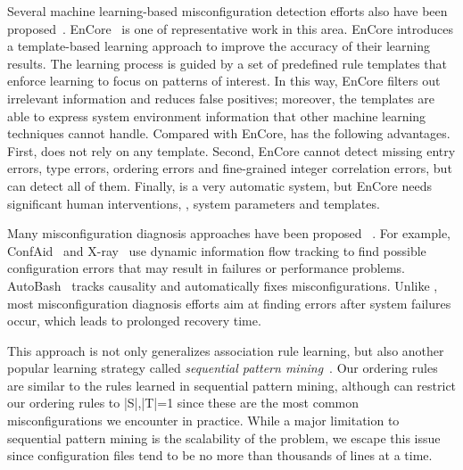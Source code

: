 Several machine learning-based misconfiguration detection efforts 
also have been proposed~\cite{yuan11context, zhang14encore}.
EnCore~\cite{zhang14encore} is one of representative work in this area.
EnCore introduces a template-based
learning approach to improve the accuracy of their learning results.
The learning process is guided by a set of predefined rule templates
that enforce learning to focus on patterns of interest.
In this way, EnCore filters out irrelevant information and reduces
false positives; moreover, the templates are able to express
system environment information that other machine learning
techniques cannot handle.
Compared with EnCore, \app has the following advantages.
First, \app does not rely on any template. 
Second, EnCore cannot detect missing entry errors, type errors,
ordering errors and fine-grained integer correlation errors,
but \app can detect all of them.
Finally, \app is a very automatic system, but
EnCore needs significant human interventions, \eg, system parameters
and templates.

Many misconfiguration diagnosis approaches have been proposed%
~\cite{attariyan10automating, attariyan12x-ray}.
For example, ConfAid~\cite{attariyan10automating} 
and X-ray~\cite{attariyan12x-ray} use dynamic information
flow tracking to find possible configuration errors that may result in
failures or performance problems. AutoBash~\cite{su07autobash} 
tracks causality and automatically fixes 
misconfigurations. Unlike \app, most misconfiguration
diagnosis efforts aim at finding errors after system
failures occur, which leads to prolonged recovery time.


This approach is not only generalizes association rule learning, but also another popular learning strategy called \textit{sequential pattern mining}~\cite{seqMine}.
Our ordering rules are similar to the rules learned in sequential pattern mining, although can restrict our ordering rules to |S|,|T|=1 since these are the most common misconfigurations we encounter in practice.
While a major limitation to sequential pattern mining is the scalability of the problem, we escape this issue since configuration files tend to be no more than thousands of lines at a time.
